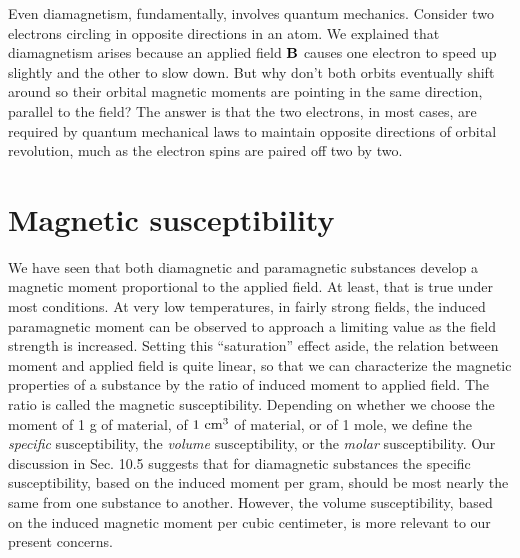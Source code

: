 Even diamagnetism, fundamentally, involves quantum mechanics.
Consider two electrons circling in opposite directions in an atom.
We explained that diamagnetism arises because an applied field $\mathbf{B}$
causes one electron to speed up slightly and the other to slow down.
But why don't both orbits eventually shift around so their orbital
magnetic moments are pointing in the same direction, parallel to
the field? The answer is that the two electrons, in most cases, are
required by quantum mechanical laws to maintain opposite 
directions of orbital revolution, much as the electron spins are paired off
two by two.

\section{Magnetic susceptibility}

We have seen that both diamagnetic and paramagnetic substances
develop a magnetic moment proportional to the applied field. At
least, that is true under most conditions. At very low temperatures,
in fairly strong fields, the induced paramagnetic moment can be
observed to approach a limiting value as the field strength is 
increased. Setting this ``saturation'' effect aside, the relation between
moment and applied field is quite linear, so that we can characterize
the magnetic properties of a substance by the ratio of induced
moment to applied field. The ratio is called the magnetic 
susceptibility. Depending on whether we choose the moment of 1 g of
material, of $1\ \textup{cm}^3$ of material, or of 1 mole, we define the \emph{specific}
susceptibility, the \emph{volume} susceptibility, or the \emph{molar} susceptibility.
Our discussion in Sec. 10.5 suggests that for diamagnetic substances
the specific susceptibility, based on the induced moment per gram,
should be most nearly the same from one substance to another.
However, the volume susceptibility, based on the induced magnetic
moment per cubic centimeter, is more relevant to our present
concerns.

